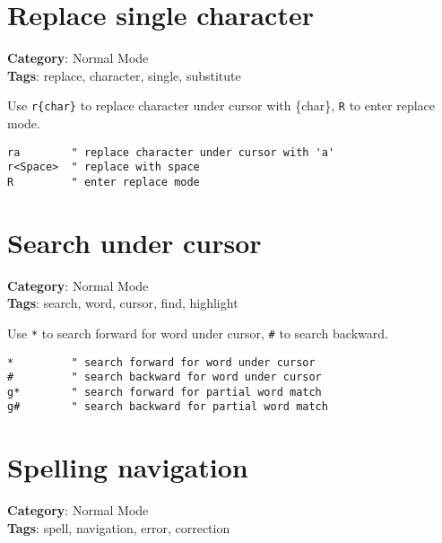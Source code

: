 {{{{{{{{{{\section{Replace single character}

\textbf{Category}: Normal Mode\\ \textbf{Tags}: replace, character, single, substitute
\vspace{0.5cm}

Use {\footnotesize \Verb§r{char}§} to replace character under cursor with \{char\}, {\footnotesize \Verb§R§} to enter replace mode.

\begin{Exa*}{}
\begin{Verbatim}[fontsize=\footnotesize, breaklines, breakanywhere]
ra        " replace character under cursor with 'a'
r<Space>  " replace with space
R         " enter replace mode
\end{Verbatim}
\end{Exa*}

\section{Search under cursor}

\textbf{Category}: Normal Mode\\ \textbf{Tags}: search, word, cursor, find, highlight
\vspace{0.5cm}

Use {\footnotesize \Verb§*§} to search forward for word under cursor, {\footnotesize \Verb§#§} to search backward.

\begin{Exa*}{}
\begin{Verbatim}[fontsize=\footnotesize, breaklines, breakanywhere]
*         " search forward for word under cursor
#         " search backward for word under cursor
g*        " search forward for partial word match
g#        " search backward for partial word match
\end{Verbatim}
\end{Exa*}

\section{Spelling navigation}

\textbf{Category}: Normal Mode\\ \textbf{Tags}: spell, navigation, error, correction
\vspace{0.5cm}

}}}}}}}}}}
